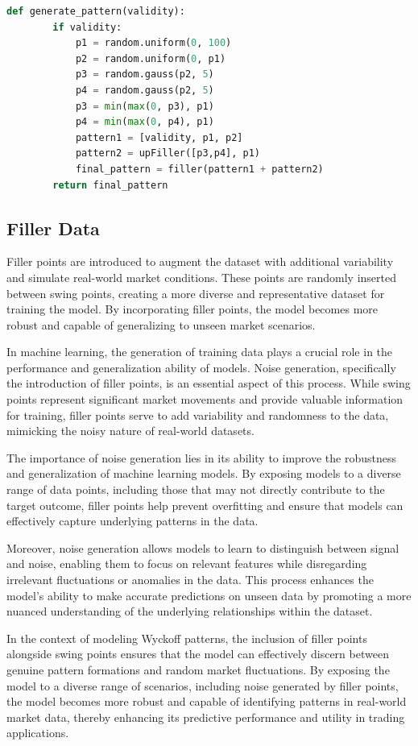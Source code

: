 \documentclass{article}
\begin{document}
\begin{lstlisting}[language=Python, caption={Creating the Secondary Test Phase Pattern}]
	def generate_pattern(validity):
		if validity:
			p1 = random.uniform(0, 100)
			p2 = random.uniform(0, p1)
			p3 = random.gauss(p2, 5) 
			p4 = random.gauss(p2, 5)
			p3 = min(max(0, p3), p1)
			p4 = min(max(0, p4), p1)
			pattern1 = [validity, p1, p2]
			pattern2 = upFiller([p3,p4], p1)
			final_pattern = filler(pattern1 + pattern2)
		return final_pattern
\end{lstlisting}


\subsection{Filler Data}
Filler points are introduced to augment the dataset with additional variability and simulate real-world market conditions. These points are randomly inserted between swing points, creating a more diverse and representative dataset for training the model. By incorporating filler points, the model becomes more robust and capable of generalizing to unseen market scenarios. 

In machine learning, the generation of training data plays a crucial role in the performance and generalization ability of models. Noise generation, specifically the introduction of filler points, is an essential aspect of this process. While swing points represent significant market movements and provide valuable information for training, filler points serve to add variability and randomness to the data, mimicking the noisy nature of real-world datasets.

The importance of noise generation lies in its ability to improve the robustness and generalization of machine learning models. By exposing models to a diverse range of data points, including those that may not directly contribute to the target outcome, filler points help prevent overfitting and ensure that models can effectively capture underlying patterns in the data.

Moreover, noise generation allows models to learn to distinguish between signal and noise, enabling them to focus on relevant features while disregarding irrelevant fluctuations or anomalies in the data. This process enhances the model's ability to make accurate predictions on unseen data by promoting a more nuanced understanding of the underlying relationships within the dataset.

In the context of modeling Wyckoff patterns, the inclusion of filler points alongside swing points ensures that the model can effectively discern between genuine pattern formations and random market fluctuations. By exposing the model to a diverse range of scenarios, including noise generated by filler points, the model becomes more robust and capable of identifying patterns in real-world market data, thereby enhancing its predictive performance and utility in trading applications.
\end{document}
